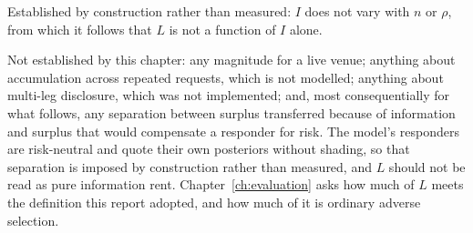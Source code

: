 Established by construction rather than measured: $I$ does not vary with $n$ or $\rho$, from
which it follows that $L$ is not a function of $I$ alone.

Not established by this chapter: any magnitude for a live venue; anything about accumulation
across repeated requests, which is not modelled; anything about multi-leg disclosure, which
was not implemented; and, most consequentially for what follows, any separation between surplus
transferred because of information and surplus that would compensate a responder for risk.
The model's responders are risk-neutral and quote their own posteriors without shading, so
that separation is imposed by construction rather than measured, and $L$ should not be read as
pure information rent. Chapter~\ref{ch:evaluation} asks how much of $L$ meets the definition
this report adopted, and how much of it is ordinary adverse selection.
